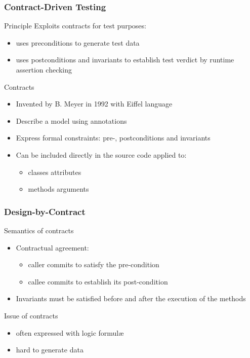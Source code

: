 \documentclass[9pt]{beamer}
\begin{document}
\begin{frame}
\frametitle{Contract-Driven Testing}

\begin{block}{Principle}
Exploits contracts for test purposes:
\begin{itemize}
\item uses preconditions to generate test data
\item uses postconditions and invariants to establish test verdict by runtime
assertion
checking
\end{itemize}
\end{block}

\begin{block}{Contracts}
\begin{itemize}
\item Invented by B. Meyer in 1992 with Eiffel language
\item Describe a model using annotations
\item Express formal constraints: pre-, postconditions and invariants
\item Can be included directly in the source code applied to:
  \begin{itemize}
  \item classes attributes
  \item methods arguments
  \end{itemize}
\end{itemize}
\end{block}

\end{frame}

\begin{frame}
\frametitle{Design-by-Contract}

\begin{block}{Semantics of contracts}
\begin{itemize}
\item Contractual agreement:
  \begin{itemize}
  \item caller commits to satisfy the pre-condition
  \item callee commits to establish its post-condition
  \end{itemize}
\item Invariants must be satisfied before and after the execution of the methods
\end{itemize}
\end{block}


\begin{block}{Issue of contracts}
\begin{itemize}
\item often expressed with logic formulæ
\item hard to generate data
\end{itemize}
\end{block}

\end{frame}
\end{document}
